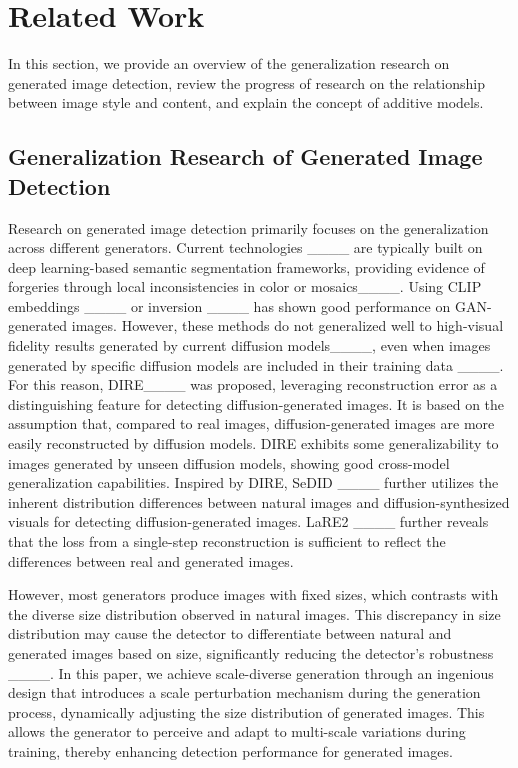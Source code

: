 \section{Related Work}
In this section, we provide an overview of the generalization research on generated image detection, review the progress of research on the relationship between image style and content, and explain the concept of additive models.


\subsection{Generalization Research of Generated Image Detection}

Research on generated image detection primarily focuses on the generalization across different generators. Current technologies ____ are typically built on deep learning-based semantic segmentation frameworks, providing evidence of forgeries through local inconsistencies in color or mosaics____.  Using CLIP embeddings ____ or inversion ____ has shown good performance on GAN-generated images. However, these methods do not generalized well to high-visual fidelity results generated by current diffusion models____, even when images generated by specific diffusion models are included in their training data ____.
For this reason, DIRE____ was proposed, leveraging reconstruction error as a distinguishing feature for detecting diffusion-generated images. It is based on the assumption that, compared to real images, diffusion-generated images are more easily reconstructed by diffusion models. DIRE exhibits some generalizability to images generated by unseen diffusion models, showing good cross-model generalization capabilities. Inspired by DIRE, SeDID ____ further utilizes the inherent distribution differences between natural images and diffusion-synthesized visuals for detecting diffusion-generated images. LaRE2 ____ further reveals that the loss from a single-step reconstruction is sufficient to reflect the differences between real and generated images.

However, most generators produce images with fixed sizes, which contrasts with the diverse size distribution observed in natural images. This discrepancy in size distribution may cause the detector to differentiate between natural and generated images based on size, significantly reducing the detector's robustness ____. In this paper, we achieve scale-diverse generation through an ingenious design that introduces a scale perturbation mechanism during the generation process, dynamically adjusting the size distribution of generated images. This allows the generator to perceive and adapt to multi-scale variations during training, thereby enhancing detection performance for generated images.

